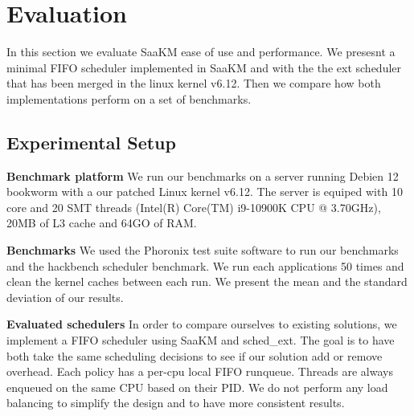 \section{Evaluation}

\par In this section we evaluate SaaKM ease of use and performance. We presesnt a minimal FIFO scheduler implemented in SaaKM and with the the ext scheduler\cite{schedext} that has been merged in the linux kernel v6.12. Then we compare how both implementations perform on a set of benchmarks. \newline

\subsection{Experimental Setup}
\par \textbf{Benchmark platform} We run our benchmarks on a server running Debien 12 bookworm with a our patched Linux kernel v6.12. The server is equiped with 10 core and 20 SMT threads (Intel(R) Core(TM) i9-10900K CPU @ 3.70GHz), 20MB of L3 cache and 64GO of RAM. \newline

\par \textbf{Benchmarks} We used the Phoronix test suite\cite{phoronix} software to run our benchmarks and the hackbench\cite{hackbench} scheduler benchmark. We run each applications 50 times and clean the kernel caches between each run. We present the mean and the standard deviation of our results. \newline

\par \textbf{Evaluated schedulers} In order to compare ourselves to existing solutions, we implement a FIFO scheduler using SaaKM and sched\_ext. The goal is to have both take the same scheduling decisions to see if our solution add or remove overhead. Each policy has a per-cpu local FIFO runqueue. Threads are always enqueued on the same CPU based on their PID. We do not perform any load balancing to simplify the design and to have more consistent results.\newline



